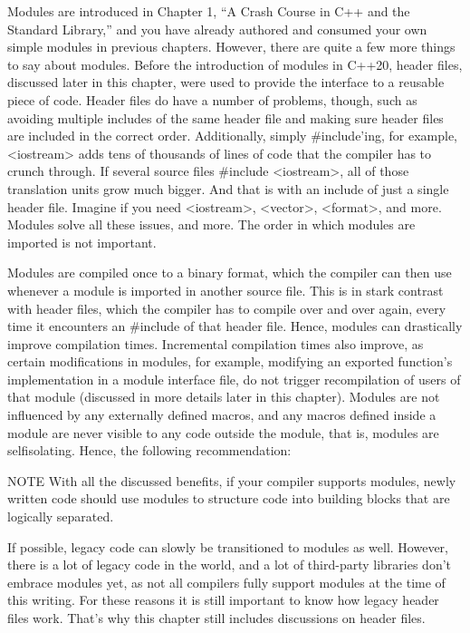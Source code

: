 
Modules are introduced in Chapter 1, “A Crash Course in C++ and the Standard Library,” and you have already authored and consumed your own simple modules in previous chapters. However, there are quite a few more things to say about modules. Before the introduction of modules in C++20, header files, discussed later in this chapter, were used to provide the interface to a reusable piece of code. Header files do have a number of problems, though, such as avoiding multiple includes of the same header file and making sure header files are included in the correct order. Additionally, simply \#include’ing, for example, <iostream> adds tens of thousands of lines of code that the compiler has to crunch through. If several source files \#include <iostream>, all of those translation units grow much bigger. And that is with an include of just a single header file. Imagine if you need <iostream>, <vector>, <format>, and more. Modules solve all these issues, and more. The order in which modules are imported is not important.

Modules are compiled once to a binary format, which the compiler can then use whenever a module is imported in another source file. This is in stark contrast with header files, which the compiler has to compile over and over again, every time it encounters an \#include of that header file. Hence, modules can drastically improve compilation times. Incremental compilation times also improve, as certain modifications in modules, for example, modifying an exported function’s implementation in a module interface file, do not trigger recompilation of users of that module (discussed in more details later in this chapter). Modules are not influenced by any externally defined macros, and any macros defined inside a module are never visible to any code outside the module, that is, modules are selfisolating. Hence, the following recommendation:

\begin{myNotic}{NOTE}
With all the discussed benefits, if your compiler supports modules, newly written code should use modules to structure code into building blocks that are logically separated.
\end{myNotic}

If possible, legacy code can slowly be transitioned to modules as well. However, there is a lot of legacy code in the world, and a lot of third-party libraries don’t embrace modules yet, as not all compilers fully support modules at the time of this writing. For these reasons it is still important to know how legacy header files work. That’s why this chapter still includes discussions on header files.

